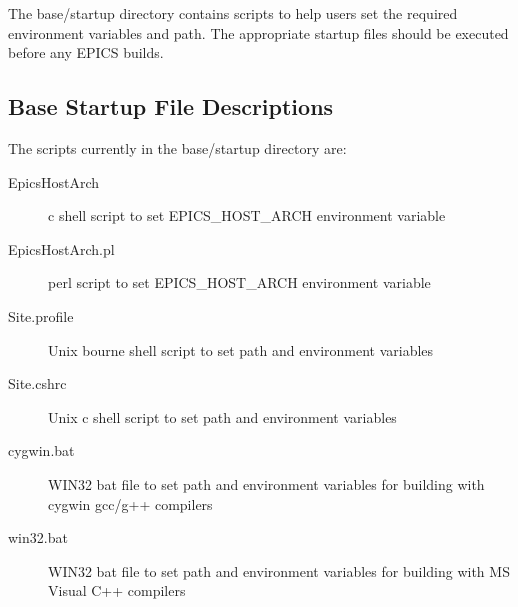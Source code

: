The base/startup directory contains scripts to help users set the required environment variables and path. The appropriate 
startup files should be executed before any EPICS builds.

\subsection{Base Startup File Descriptions}

The scripts currently in the base/startup directory are:

\begin{description}

\item[EpicsHostArch]

c shell script to set EPICS\_HOST\_ARCH environment variable

\item[EpicsHostArch.pl]

perl script to set EPICS\_HOST\_ARCH environment variable

\item[Site.profile]

Unix bourne shell script to set path and environment variables

\item[Site.cshrc]

Unix c shell script to set path and environment variables

\item[cygwin.bat]

WIN32 bat file to set path and environment variables for building with cygwin gcc/g++ compilers

\item[win32.bat]

WIN32 bat file to set path and environment variables for building with MS Visual C++ compilers

\end{description}








